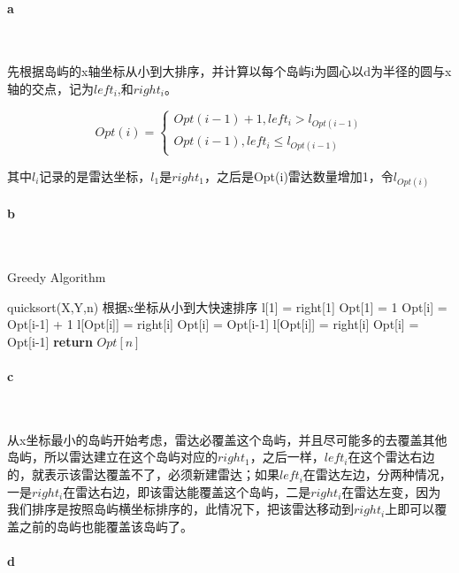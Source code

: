 \documentclass{article}
\begin{document}
		\paragraph{a}\
		
		先根据岛屿的x轴坐标从小到大排序，并计算以每个岛屿i为圆心以d为半径的圆与x轴的交点，记为${left_i}$,和${right_i}$。
		
		\[Opt(i) = \left\{ \begin{array}{l}
		Opt(i - 1) + 1,lef{t_i} > {l_{Opt(i - 1)}}\\
		Opt(i - 1),lef{t_i} \le {l_{Opt(i - 1)}}
		\end{array} \right.\]
		
		其中${l_i}$记录的是雷达坐标，${l_1}$是${right_1}$，之后是Opt(i)雷达数量增加1，令${l_{Opt(i)}}$
	
		\paragraph{b}\
			\begin{algorithm}
				\caption{Greedy Algorithm}
				\begin{algorithmic}
					\State quicksort(X,Y,n)  \Comment 根据x坐标从小到大快速排序
					\State l[1] = right[1]
					\State Opt[1] = 1
					\State Opt[i] = Opt[i-1] + 1
					\State l[Opt[i]] = right[i]
					\State Opt[i] = Opt[i-1]
					\State l[Opt[i]] = right[i]
					\Else
					\State Opt[i] = Opt[i-1]
					\EndIf
					\EndFor
					\State \textbf{return} $Opt[n]$
					\EndProcedure
				\end{algorithmic}
			\end{algorithm}
		\paragraph{c}\
			
			从x坐标最小的岛屿开始考虑，雷达必覆盖这个岛屿，并且尽可能多的去覆盖其他岛屿，所以雷达建立在这个岛屿对应的${right_1}$，之后一样，${left_i}$在这个雷达右边的，就表示该雷达覆盖不了，必须新建雷达；如果${left_i}$在雷达左边，分两种情况，一是${right_i}$在雷达右边，即该雷达能覆盖这个岛屿，二是${right_i}$在雷达左变，因为我们排序是按照岛屿横坐标排序的，此情况下，把该雷达移动到${right_i}$上即可以覆盖之前的岛屿也能覆盖该岛屿了。
		
		\paragraph{d}\
			
\end{document}
